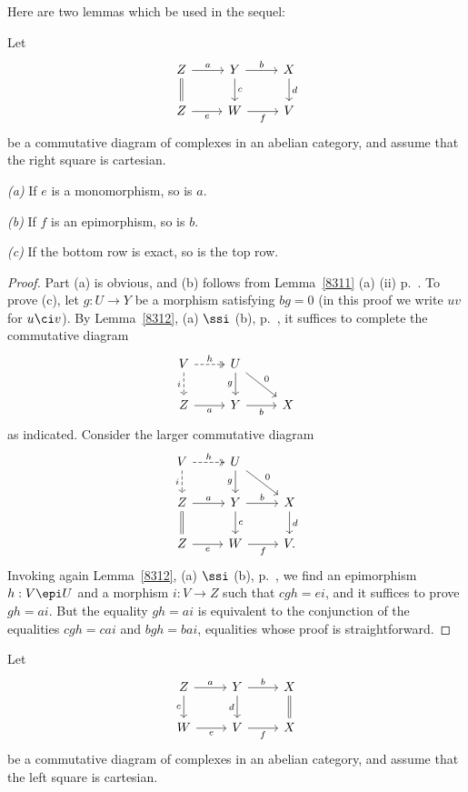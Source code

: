 \documentclass[12pt]{article}
\theoremstyle{remark}
\theoremstyle{definition}
\begin{document}
%

\begin{s}
Here are two lemmas which be used in the sequel:
\begin{lem}
Let
$$
\begin{tikzcd}
Z\ar[equal]{d}\ar{r}{a}&Y\ar{d}{c}\ar{r}{b}&X\ar{d}{d}\\ 
Z\ar{r}[swap]{e}&W\ar{r}[swap]{f}&V
\end{tikzcd}
$$ 
be a commutative diagram of complexes in an abelian category, and assume that the right square is cartesian. 

\nn\emph{(a)} If $e$ is a monomorphism, so is $a$.

\nn\emph{(b)} If $f$ is an epimorphism, so is $b$.

\nn\emph{(c)} If the bottom row is exact, so is the top row.
\end{lem}
\begin{proof} 
Part (a) is obvious, and (b) follows from Lemma~\ref{8311} (a) (ii) p.~. To prove (c), let $g:U\to Y$ be a morphism satisfying $bg=0$ (in this proof we write $uv$ for $u\ci v$). By Lemma~\ref{8312}, (a) $\ssi$ (b), p.~, it suffices to complete the commutative diagram
$$
\begin{tikzcd}
V\ar[dashed]{d}[swap]{i}\ar[dashed,two heads]{r}{h}&U\ar{dr}{0}\ar{d}[swap]{g}\\ 
Z\ar{r}[swap]{a}&Y\ar{r}[swap]{b}&X
\end{tikzcd}
$$ 
as indicated. Consider the larger commutative diagram 
$$
\begin{tikzcd}
V\ar[dashed]{d}[swap]{i}\ar[dashed,two heads]{r}{h}&U\ar{dr}{0}\ar{d}[swap]{g}\\ 
Z\ar[equal]{d}\ar{r}{a}&Y\ar{d}{c}\ar{r}{b}&X\ar{d}{d}\\ 
Z\ar{r}[swap]{e}&W\ar{r}[swap]{f}&V.
\end{tikzcd}
$$ 
Invoking again Lemma~\ref{8312}, (a) $\ssi$ (b), p.~, we find an epimorphism $h:V\epi U$ and a morphism $i:V\to Z$ such that $cgh=ei$, and it suffices to prove $gh=ai$. But the equality $gh=ai$ is equivalent to the conjunction of the equalities $cgh=cai$ and $bgh=bai$, equalities whose proof is straightforward.
\end{proof}

\begin{lem}
Let 
$$
\begin{tikzcd}
Z\ar[d,"c"']\ar[r,"a"]&Y\ar[d,"d"']\ar[r,"b"]&X\ar[d,equal]\\ 
W\ar[r,"e"']&V\ar[r,"f"']&X
\end{tikzcd}
$$ 
be a commutative diagram of complexes in an abelian category, and assume that the left square is cartesian. 


\end{lem}
\end{s}
\end{document}
